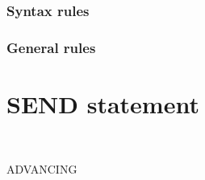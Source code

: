 \subsubsection{Syntax rules}

\subsubsection{General rules}

\section{SEND statement}

\begin{syntax}[\deletedcolour]
\end{syntax}

\begin{syntax}[\deletedcolour]

  \begin{0-1}
    \begin{1=}
       \\
    \end{1=}
    ADVANCING
    \begin{1=}
      \begin{1=}
        \identifier \\
        \literal
      \end{1=}
      \begin{0-1}
         \\
      \end{0-1} \\

      \mnemonicname \\

    \end{1=}
  \end{0-1}

\end{syntax}

